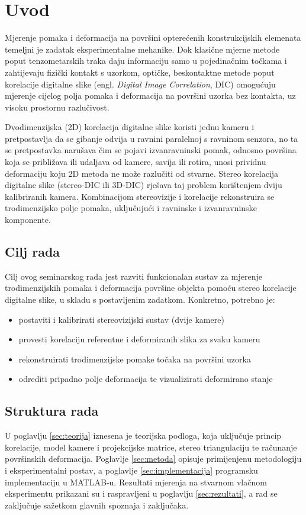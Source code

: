 \section{Uvod}

Mjerenje pomaka i deformacija na površini opterećenih konstrukcijskih elemenata
temeljni je zadatak eksperimentalne mehanike. Dok klasične mjerne metode poput
tenzometarskih traka daju informaciju samo u pojedinačnim točkama i zahtijevaju
fizički kontakt s uzorkom, optičke, beskontaktne metode poput korelacije digitalne
slike (engl. \textit{Digital Image Correlation}, DIC)
omogućuju mjerenje cijelog polja pomaka i deformacija na površini uzorka bez
kontakta, uz visoku prostornu razlučivost.

Dvodimenzijska (2D) korelacija digitalne slike koristi jednu kameru i pretpostavlja
da se gibanje odvija u ravnini paralelnoj s ravninom senzora, no ta se pretpostavka
narušava čim se pojavi izvanravninski pomak, odnosno površina koja se približava ili
udaljava od kamere, savija ili rotira, unosi prividnu deformaciju koju 2D metoda
ne može razlučiti od stvarne. Stereo korelacija digitalne slike
(stereo-DIC ili 3D-DIC) rješava taj problem korištenjem dviju kalibriranih kamera.
Kombinacijom stereovizije i korelacije rekonstruira se trodimenzijsko polje
pomaka, uključujući i ravninske i izvanravninske komponente.

\subsection{Cilj rada}

Cilj ovog seminarskog rada jest razviti funkcionalan sustav za mjerenje
trodimenzijskih pomaka i deformacija površine objekta pomoću stereo korelacije
digitalne slike, u skladu s postavljenim zadatkom. Konkretno, potrebno je:
\begin{itemize}
  \item postaviti i kalibrirati stereovizijski sustav (dvije kamere)
  \item provesti korelaciju referentne i deformiranih slika za svaku kameru
  \item rekonstruirati trodimenzijske pomake točaka na površini uzorka
  \item odrediti pripadno polje deformacija te vizualizirati deformirano stanje
\end{itemize}

\subsection{Struktura rada}

U poglavlju \ref{sec:teorija} iznesena je teorijska podloga, koja uključuje
princip korelacije,
model kamere i projekcijske matrice, stereo triangulaciju te računanje površinskih
deformacija. Poglavlje
\ref{sec:metoda} opisuje primijenjenu metodologiju i eksperimentalni postav, a
poglavlje \ref{sec:implementacija} programsku implementaciju u MATLAB-u.
Rezultati mjerenja na stvarnom vlačnom eksperimentu prikazani su i raspravljeni u
poglavlju \ref{sec:rezultati}, a rad se zaključuje sažetkom glavnih spoznaja i zaključaka.
